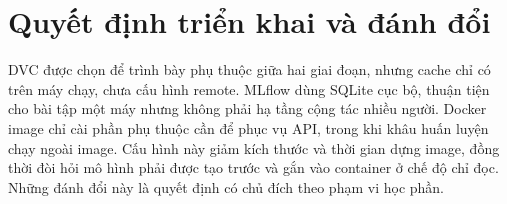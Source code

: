 \section{Quyết định triển khai và đánh đổi}
DVC được chọn để trình bày phụ thuộc giữa hai giai đoạn, nhưng cache chỉ có trên máy chạy, chưa cấu hình remote. MLflow dùng SQLite cục bộ, thuận tiện cho bài tập một máy nhưng không phải hạ tầng cộng tác nhiều người. Docker image chỉ cài phần phụ thuộc cần để phục vụ API, trong khi khâu huấn luyện chạy ngoài image. Cấu hình này giảm kích thước và thời gian dựng image, đồng thời đòi hỏi mô hình phải được tạo trước và gắn vào container ở chế độ chỉ đọc. Những đánh đổi này là quyết định có chủ đích theo phạm vi học phần.

